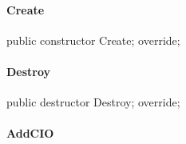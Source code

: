\documentclass{report}
\newif\ifpdf
\begin{document}
\paragraph*{Create}\hspace*{\fill}

\label{PasDoc_Items.TPasUnit-Create}
\begin{list}{}{
\setlength{\itemindent}{0cm}
\setlength{\listparindent}{0cm}
\setlength{\leftmargin}{\evensidemargin}
\addtolength{\leftmargin}{\tmplength}
\settowidth{\labelsep}{X}
\addtolength{\leftmargin}{\labelsep}
\setlength{\labelwidth}{\tmplength}
}
\item[\textbf{Declaration}\hfill]
\ifpdf
\begin{flushleft}
\fi
\begin{ttfamily}
public constructor Create; override;\end{ttfamily}

\ifpdf
\end{flushleft}
\fi

\end{list}
\paragraph*{Destroy}\hspace*{\fill}

\label{PasDoc_Items.TPasUnit-Destroy}
\begin{list}{}{
\setlength{\itemindent}{0cm}
\setlength{\listparindent}{0cm}
\setlength{\leftmargin}{\evensidemargin}
\addtolength{\leftmargin}{\tmplength}
\settowidth{\labelsep}{X}
\addtolength{\leftmargin}{\labelsep}
\setlength{\labelwidth}{\tmplength}
}
\item[\textbf{Declaration}\hfill]
\ifpdf
\begin{flushleft}
\fi
\begin{ttfamily}
public destructor Destroy; override;\end{ttfamily}

\ifpdf
\end{flushleft}
\fi

\end{list}
\paragraph*{AddCIO}\hspace*{\fill}
\end{document}
